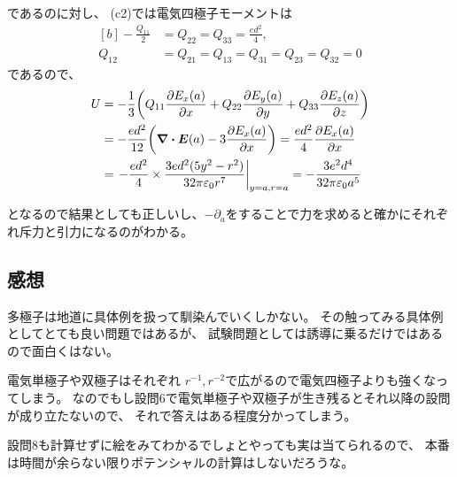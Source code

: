 \documentclass[../../sp_2022.tex]{subfiles}
\begin{document}
であるのに対し、
(c2)では電気四極子モーメントは
\begin{equation}\begin{aligned}[b]
    -\frac{Q_{11}}{2} &= Q_{22} = Q_{33} = \frac{ed^2}{4},\\
    Q_{12} &= Q_{21} = Q_{13} = Q_{31} = Q_{23} = Q_{32} = 0
\end{aligned}\end{equation}
であるので、
\begin{equation}\begin{aligned}[b]
    U &= -\frac{1}{3} \qty(Q_{11}\pdv{E_x(a)}{x}+Q_{22}\pdv{E_y(a)}{y}+Q_{33}\pdv{E_z(a)}{z})\\
    &= -\frac{ed^2}{12} \qty(\div \vb*{E}(a)-3\pdv{E_x(a)}{x})
    = \frac{ed^2}{4} \pdv{E_x(a)}{x}\\
    &= \left.-\frac{ed^2}{4} \times \frac{3ed^2(5y^2-r^2)}{32\pi\varepsilon_0r^7}\right|_{y=a,r=a}
    = -\frac{3e^2d^4}{32\pi\varepsilon_0a^5}
\end{aligned}\end{equation}

となるので結果としても正しいし、\(-\partial_a\)をすることで力を求めると確かにそれぞれ斥力と引力になるのがわかる。

\subsection*{感想}
多極子は地道に具体例を扱って馴染んでいくしかない。
その触ってみる具体例としてとても良い問題ではあるが、
試験問題としては誘導に乗るだけではあるので面白くはない。

電気単極子や双極子はそれぞれ \(r^{-1},r^{-2}\)で広がるので電気四極子よりも強くなってしまう。
なのでもし設問6で電気単極子や双極子が生き残るとそれ以降の設問が成り立たないので、
それで答えはある程度分かってしまう。

設問8も計算せずに絵をみてわかるでしょとやっても実は当てられるので、
本番は時間が余らない限りポテンシャルの計算はしないだろうな。
\end{document}
